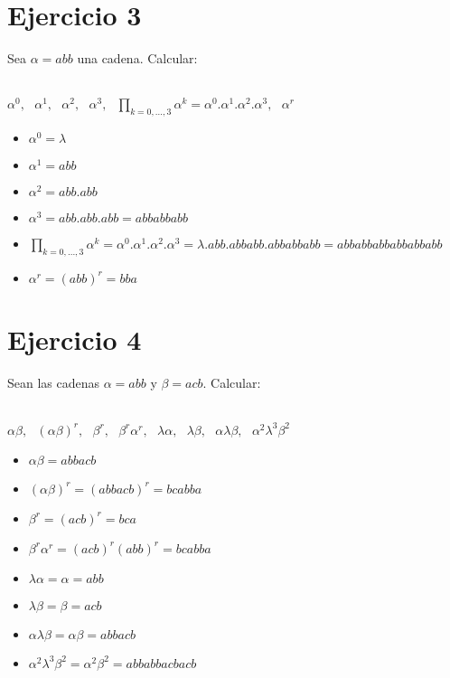 \documentclass{article}
\begin{document}
{\section*{Ejercicio 3}{Sea \textit{$\alpha = abb$} una cadena. Calcular:}
\\
\\
\centerline{$\alpha^0,\ \ \ \alpha^1,\ \ \ \alpha^2,\ \ \ \alpha^3,\ \ \ \prod_{k=0,...,3}{\alpha^k = \alpha^0.\alpha^1.\alpha^2.\alpha^3},\ \ \ \alpha^r$}

\begin{itemize}
    \item $\alpha^0 = \lambda$
    \item $\alpha^1 = \textit{abb}$
    \item $\alpha^2 = \textit{abb}{.}\textit{abb}$
    \item $\alpha^3 = \textit{abb}{.}\textit{abb}{.}\textit{abb} = \textit{abbabbabb}$
    \item $\prod_{k=0,...,3}{\alpha^k = \alpha^0.\alpha^1.\alpha^2.\alpha^3} = \lambda.\textit{abb}{.}\textit{abbabb}{.}\textit{abbabbabb} = \textit{abbabbabbabbabbabb}$
    \item $\alpha^r = (\textit{abb})^r = \textit{bba}$
\end{itemize}

\section*{Ejercicio 4}{{Sean las cadenas \textit{$\alpha = abb$} y \textit{$\beta = acb$}. Calcular:}
\\
\\
\centerline{$\alpha\beta,\ \ \ (\alpha\beta)^r,\ \ \ \beta^r,\ \ \ \beta^r\alpha^r,\ \ \ \lambda\alpha,\ \ \ \lambda\beta, \ \ \ \alpha\lambda\beta, \ \ \ \alpha^2\lambda^3\beta^2$}

\begin{itemize}
    \item $\alpha\beta = \textit{abbacb}$
    \item $(\alpha\beta)^r = (\textit{abbacb})^r = \textit{bcabba}$
    \item $\beta^r = (\textit{acb})^r = \textit{bca}$
    \item $\beta^r\alpha^r = (\textit{acb})^r(\textit{abb})^r = \textit{bcabba}$
    \item $\lambda\alpha = \alpha = \textit{abb}$
    \item $\lambda\beta = \beta = \textit{acb}$
    \item $\alpha\lambda\beta = \alpha\beta = \textit{abbacb}$
    \item $\alpha^2\lambda^3\beta^2 = \alpha^2\beta^2 = \textit{abbabbacbacb}$
\end{itemize}

}}
\end{document}
